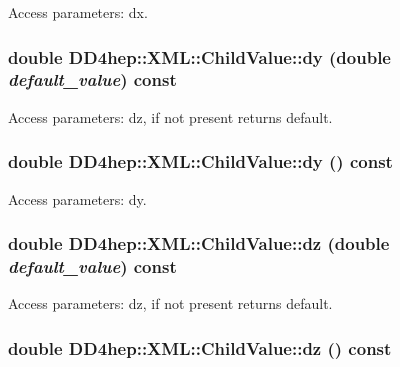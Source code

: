 Access parameters: dx. \hypertarget{struct_d_d4hep_1_1_x_m_l_1_1_child_value_a746a8520336d657ea0f42e0e4e1f14a6}{
\subsubsection[{dy}]{\setlength{\rightskip}{0pt plus 5cm}double DD4hep::XML::ChildValue::dy (double {\em default\_\-value}) const}}
\label{struct_d_d4hep_1_1_x_m_l_1_1_child_value_a746a8520336d657ea0f42e0e4e1f14a6}


Access parameters: dz, if not present returns default. \hypertarget{struct_d_d4hep_1_1_x_m_l_1_1_child_value_aabb81a51df0e722851ac0d738f73de4c}{
\subsubsection[{dy}]{\setlength{\rightskip}{0pt plus 5cm}double DD4hep::XML::ChildValue::dy () const}}
\label{struct_d_d4hep_1_1_x_m_l_1_1_child_value_aabb81a51df0e722851ac0d738f73de4c}


Access parameters: dy. \hypertarget{struct_d_d4hep_1_1_x_m_l_1_1_child_value_a482910356250eed75d384fe9adb3a8e5}{
\subsubsection[{dz}]{\setlength{\rightskip}{0pt plus 5cm}double DD4hep::XML::ChildValue::dz (double {\em default\_\-value}) const}}
\label{struct_d_d4hep_1_1_x_m_l_1_1_child_value_a482910356250eed75d384fe9adb3a8e5}


Access parameters: dz, if not present returns default. \hypertarget{struct_d_d4hep_1_1_x_m_l_1_1_child_value_ab635eee327457283092d8be149a86e7d}{
\subsubsection[{dz}]{\setlength{\rightskip}{0pt plus 5cm}double DD4hep::XML::ChildValue::dz () const}}
\label{struct_d_d4hep_1_1_x_m_l_1_1_child_value_ab635eee327457283092d8be149a86e7d}


